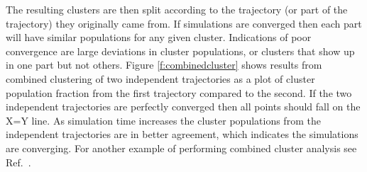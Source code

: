 The resulting clusters are then split according to the trajectory (or part of the trajectory) they originally came from. If simulations are converged then each part will have similar populations for any given cluster. Indications of poor convergence are large deviations in cluster populations, or clusters that show up in one part but not others. Figure \ref{f:combinedcluster} shows results from combined clustering of two independent trajectories as a plot of cluster population fraction from the first trajectory compared to the second. If the two independent trajectories are perfectly converged then all points should fall on the X=Y line. As simulation time increases the cluster populations from the independent trajectories are in better agreement, which indicates the simulations are converging. For another example of performing combined cluster analysis see Ref.\ \citep{Bergonzo2014}.
